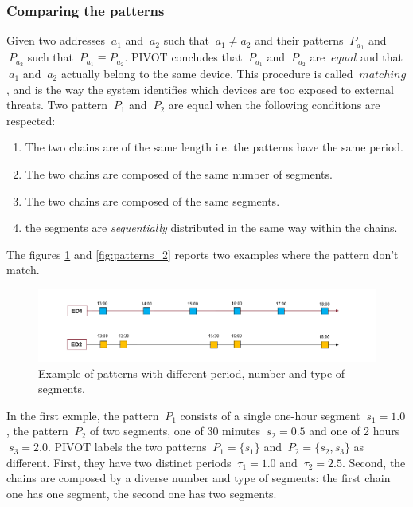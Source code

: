 \subsubsection{Comparing the patterns}
Given two addresses \(\ a_{1} \) and \(\ a_{2} \) such that \(\ a_{1} \neq a_{2} \) and their patterns \(\ P_{a_{1}} \) and \(\ P_{a_{2}} \) such that \(\ P_{a_{1}} \equiv  P_{a_{2}} \). PIVOT concludes that \(\ P_{a_{1}} \) and \(\ P_{a_{2}} \) are \(\ equal \) and that \(\ a_{1} \) and \(\ a_{2}\) actually belong to the same device. This procedure is called \(\ matching\), and is the way the system identifies which devices are too exposed to external threats.
Two pattern \(\ P_{1} \) and \(\ P_{2} \) are equal when the following conditions are respected:
\begin{enumerate}
	\item The two chains are of the same length i.e. the patterns have the same period.
	\item The two chains are composed of the same number of segments.
	\item The two chains are composed of the same segments.
	\item the segments are \textit{sequentially} distributed in the same way within the chains.
\end{enumerate}
The figures \ref{fig:patterns_1} and \ref{fig:patterns_2} reports two examples where the pattern don't match.

\vspace{3mm}
\begin{figure}[H]
    \centering
    \includegraphics[width=0.7\linewidth]{images/pivot/patterns.PNG}
    \caption{Example of patterns with different period, number and type of segments.}
    \label{fig:patterns_1}
\end{figure}
\vspace{3mm}

In the first exmple, the pattern \(\ P_{1} \) consists of a single one-hour segment \(\ s_{1} = 1.0 \), the pattern \(\ P_{2} \) of two segments, one of 30 minutes \(\ s_{2} = 0.5 \) and one of 2 hours \(\ s_{3} = 2.0 \). PIVOT labels the two patterns \(\ P_{1} = \{s_{1}\} \) and \(\ P_{2} = \{s_{2}, s_{3}\} \) as different. First, they have two distinct periods \(\ \tau_{1} = 1.0 \) and \(\ \tau_{2} = 2.5 \). Second, the chains are composed by a diverse number and type of segments: the first chain one has one segment, the second one has two segments.

